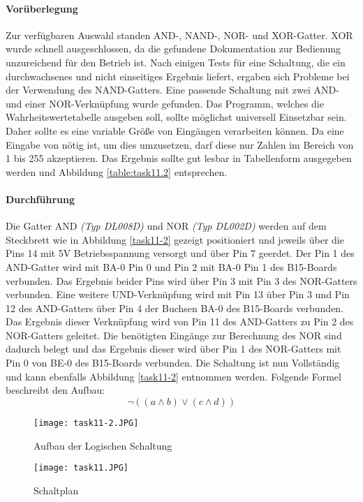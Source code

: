 \paragraph{Vorüberlegung}
Zur verfügbaren Auswahl standen AND-, NAND-, NOR- und XOR-Gatter. XOR wurde schnell ausgeschlossen, da die gefundene Dokumentation zur Bedienung unzureichend für den Betrieb ist. Nach einigen Tests für eine Schaltung, die ein durchwachsenes und nicht einseitiges Ergebnis liefert, ergaben sich Probleme bei der Verwendung des NAND-Gatters. Eine passende Schaltung mit zwei AND- und einer NOR-Verknüpfung wurde gefunden. Das Programm, welches die Wahrheitswertetabelle ausgeben soll, sollte möglichst universell Einsetzbar sein. Daher sollte es eine variable Größe von Eingängen verarbeiten können. Da eine Eingabe von nötig ist, um dies umzusetzen, darf diese nur Zahlen im Bereich von 1 bis 255 akzeptieren. Das Ergebnis sollte gut lesbar in Tabellenform ausgegeben werden und Abbildung \vref{table:task11.2} entsprechen.

\paragraph{Durchführung}
Die Gatter AND \textit{(Typ DL008D)} und NOR \textit{(Typ DL002D)} werden auf dem Steckbrett wie in Abbildung \vref{task11-2} gezeigt positioniert und jeweils über die Pins 14 mit 5V Betriebsspannung versorgt und über Pin 7 geerdet. Der Pin 1 des AND-Gatter wird mit BA-0 Pin 0 und Pin 2 mit BA-0 Pin 1 des B15-Boards verbunden. Das Ergebnis beider Pins wird über Pin 3 mit Pin 3 des NOR-Gatters verbunden. Eine weitere UND-Verknüpfung wird mit Pin 13 über Pin 3 und Pin 12 des AND-Gatters über Pin 4 der Buchsen BA-0 des B15-Boards verbunden. Das Ergebnis dieser Verknüpfung wird von Pin 11 des AND-Gatters zu Pin 2 des NOR-Gatters geleitet. Die benötigten Eingänge zur Berechnung des NOR sind dadurch belegt und das Ergebnis dieser wird über Pin 1 des NOR-Gatters mit Pin 0 von BE-0 des B15-Boards verbunden. Die Schaltung ist nun Vollständig und kann ebenfalls Abbildung \vref{task11-2} entnommen werden. Folgende Formel beschreibt den Aufbau:
\[\neg{((a \land b) \lor (c \land d))}\]

\begin{figure}
	\centering
	\texttt{[image: task11-2.JPG]}
	\caption{Aufbau der Logischen Schaltung}
	\label{task11-2}
\end{figure}

\begin{figure}
	\centering
	\texttt{[image: task11.JPG]}
	\caption{Schaltplan}
	\label{task11-2-1}
\end{figure}

